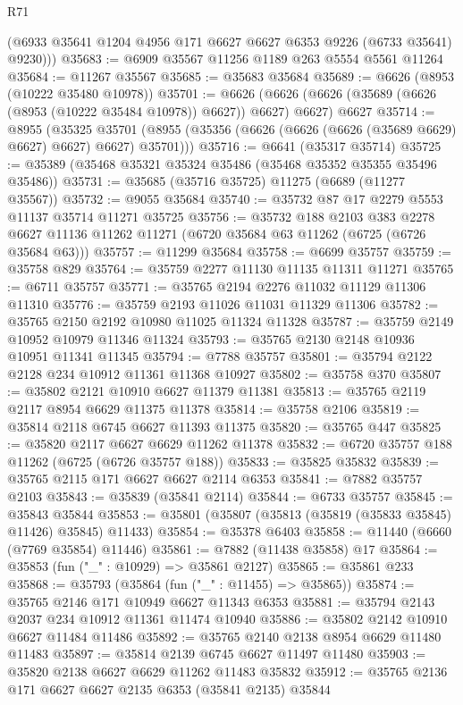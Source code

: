\begin{lexlean}{R71}
\begin{coremodule}
        (@6933 @35641 @1204 @4956 @171 @6627 @6627 @6353 @9226 (@6733 @35641) @9230)))
@35683 := @6909 @35567 @11256 @1189 @263 @5554 @5561 @11264
@35684 := @11267 @35567
@35685 := @35683 @35684
@35689 := @6626 (@8953 (@10222 @35480 @10978))
@35701 := @6626
    (@6626 (@6626 (@35689 (@6626 (@8953 (@10222 @35484 @10978)) @6627)) @6627) @6627)
    @6627
@35714 := @8955
    (@35325 @35701 (@8955 (@35356 (@6626 (@6626 (@6626 (@35689 @6629) @6627) @6627) @6627) @35701)))
@35716 := @6641 (@35317 @35714)
@35725 := @35389 (@35468 @35321 @35324 @35486 (@35468 @35352 @35355 @35496 @35486))
@35731 := @35685 (@35716 @35725) @11275 (@6689 (@11277 @35567))
@35732 := @9055 @35684
@35740 := @35732 @87 @17 @2279 @5553 @11137 @35714 @11271 @35725
@35756 := @35732
    @188
    @2103
    @383
    @2278
    @6627
    @11136
    @11262
    @11271
    (@6720 @35684 @63 @11262 (@6725 (@6726 @35684 @63)))
@35757 := @11299 @35684
@35758 := @6699 @35757
@35759 := @35758 @829
@35764 := @35759 @2277 @11130 @11135 @11311 @11271
@35765 := @6711 @35757
@35771 := @35765 @2194 @2276 @11032 @11129 @11306 @11310
@35776 := @35759 @2193 @11026 @11031 @11329 @11306
@35782 := @35765 @2150 @2192 @10980 @11025 @11324 @11328
@35787 := @35759 @2149 @10952 @10979 @11346 @11324
@35793 := @35765 @2130 @2148 @10936 @10951 @11341 @11345
@35794 := @7788 @35757
@35801 := @35794 @2122 @2128 @234 @10912 @11361 @11368 @10927
@35802 := @35758 @370
@35807 := @35802 @2121 @10910 @6627 @11379 @11381
@35813 := @35765 @2119 @2117 @8954 @6629 @11375 @11378
@35814 := @35758 @2106
@35819 := @35814 @2118 @6745 @6627 @11393 @11375
@35820 := @35765 @447
@35825 := @35820 @2117 @6627 @6629 @11262 @11378
@35832 := @6720 @35757 @188 @11262 (@6725 (@6726 @35757 @188))
@35833 := @35825 @35832
@35839 := @35765 @2115 @171 @6627 @6627 @2114 @6353
@35841 := @7882 @35757 @2103
@35843 := @35839 (@35841 @2114)
@35844 := @6733 @35757
@35845 := @35843 @35844
@35853 := @35801 (@35807 (@35813 (@35819 (@35833 @35845) @11426) @35845) @11433)
@35854 := @35378 @6403
@35858 := @11440 (@6660 (@7769 @35854) @11446)
@35861 := @7882 (@11438 @35858) @17
@35864 := @35853 (fun ("_" : @10929) => @35861 @2127)
@35865 := @35861 @233
@35868 := @35793 (@35864 (fun ("_" : @11455) => @35865))
@35874 := @35765 @2146 @171 @10949 @6627 @11343 @6353
@35881 := @35794 @2143 @2037 @234 @10912 @11361 @11474 @10940
@35886 := @35802 @2142 @10910 @6627 @11484 @11486
@35892 := @35765 @2140 @2138 @8954 @6629 @11480 @11483
@35897 := @35814 @2139 @6745 @6627 @11497 @11480
@35903 := @35820 @2138 @6627 @6629 @11262 @11483 @35832
@35912 := @35765 @2136 @171 @6627 @6627 @2135 @6353 (@35841 @2135) @35844

\end{coremodule}
\end{lexlean}

